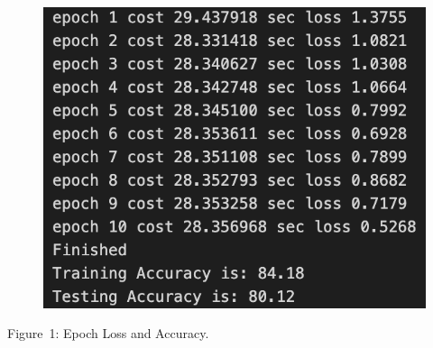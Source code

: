 \documentclass{article}
\begin{document}
\begin{figure}[h]
    \centering
    \includegraphics[scale=0.6]{accuracy.png}
  \end{figure}
\centering Figure\ 1: Epoch Loss and Accuracy.
\end{document}
